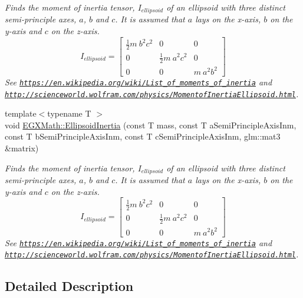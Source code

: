 \begin{DoxyCompactItemize}
\begin{DoxyCompactList}\small\item\em Finds the moment of inertia tensor, $I_{ellipsoid}$ of an ellipsoid with three distinct semi-\/principle axes, $a$, $b$ and $c$. It is assumed that $a$ lays on the x-\/axis, $b$ on the y-\/axis and $c$ on the z-\/axis. \[ I_{ellipsoid}=\begin{bmatrix} \frac{1}{2}m\ b^2c^2 & 0 & 0\\ 0 & \frac{1}{2}m\ a^2c^2 & 0\\ 0 & 0 & m\ a^2b^2 \end{bmatrix} \] See \href{https://en.wikipedia.org/wiki/List_of_moments_of_inertia}{\tt https\+://en.\+wikipedia.\+org/wiki/\+List\+\_\+of\+\_\+moments\+\_\+of\+\_\+inertia} and \href{http://scienceworld.wolfram.com/physics/MomentofInertiaEllipsoid.html}{\tt http\+://scienceworld.\+wolfram.\+com/physics/\+Momentof\+Inertia\+Ellipsoid.\+html}. \end{DoxyCompactList}\item 
{\footnotesize template$<$typename T $>$ }\\void \mbox{\hyperlink{group___e_g_x_math-_geometry-3_d-_ellipsoid-_inertia_gaed602dd93a68fdd7d4bafe883b093153}{E\+G\+X\+Math\+::\+Ellipsoid\+Inertia}} (const T mass, const T a\+Semi\+Principle\+Axis\+Inm, const T b\+Semi\+Principle\+Axis\+Inm, const T c\+Semi\+Principle\+Axis\+Inm, glm\+::mat3 \&matrix)
\begin{DoxyCompactList}\small\item\em Finds the moment of inertia tensor, $I_{ellipsoid}$ of an ellipsoid with three distinct semi-\/principle axes, $a$, $b$ and $c$. It is assumed that $a$ lays on the x-\/axis, $b$ on the y-\/axis and $c$ on the z-\/axis. \[ I_{ellipsoid}=\begin{bmatrix} \frac{1}{2}m\ b^2c^2 & 0 & 0\\ 0 & \frac{1}{2}m\ a^2c^2 & 0\\ 0 & 0 & m\ a^2b^2 \end{bmatrix} \] See \href{https://en.wikipedia.org/wiki/List_of_moments_of_inertia}{\tt https\+://en.\+wikipedia.\+org/wiki/\+List\+\_\+of\+\_\+moments\+\_\+of\+\_\+inertia} and \href{http://scienceworld.wolfram.com/physics/MomentofInertiaEllipsoid.html}{\tt http\+://scienceworld.\+wolfram.\+com/physics/\+Momentof\+Inertia\+Ellipsoid.\+html}. \end{DoxyCompactList}\end{DoxyCompactItemize}


\subsection{Detailed Description}


